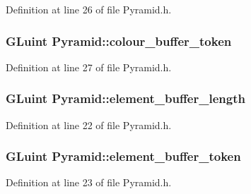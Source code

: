 Definition at line 26 of file Pyramid.\+h.

\hypertarget{class_pyramid_a20c19661fc7ece0b2122af63501a3f0c}{}
\subsubsection[{colour\+\_\+buffer\+\_\+token}]{\setlength{\rightskip}{0pt plus 5cm}G\+Luint Pyramid\+::colour\+\_\+buffer\+\_\+token\hspace{0.3cm}{\ttfamily [private]}}\label{class_pyramid_a20c19661fc7ece0b2122af63501a3f0c}


Definition at line 27 of file Pyramid.\+h.

\hypertarget{class_pyramid_a9692c05fe1796a90a4bf995bea95f7f2}{}
\subsubsection[{element\+\_\+buffer\+\_\+length}]{\setlength{\rightskip}{0pt plus 5cm}G\+Luint Pyramid\+::element\+\_\+buffer\+\_\+length\hspace{0.3cm}{\ttfamily [private]}}\label{class_pyramid_a9692c05fe1796a90a4bf995bea95f7f2}


Definition at line 22 of file Pyramid.\+h.

\hypertarget{class_pyramid_a760ec3c4f40ea025e57f0f95d118a921}{}
\subsubsection[{element\+\_\+buffer\+\_\+token}]{\setlength{\rightskip}{0pt plus 5cm}G\+Luint Pyramid\+::element\+\_\+buffer\+\_\+token\hspace{0.3cm}{\ttfamily [private]}}\label{class_pyramid_a760ec3c4f40ea025e57f0f95d118a921}


Definition at line 23 of file Pyramid.\+h.

\hypertarget{class_pyramid_a6c97c4bb0dd7e4f12e50edd8dcc1cce9}{}
